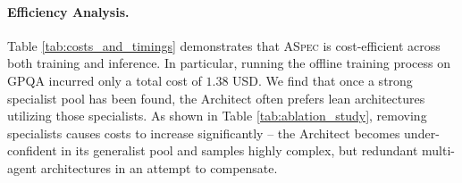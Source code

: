 \documentclass{article} %
\begin{document}
\begin{table}[H]
\caption{Efficiency comparison across methods on the GPQA benchmark.}
\label{tab:costs_and_timings}
\centering
\scriptsize
{}
\end{table}


\paragraph{Efficiency Analysis.} Table \ref{tab:costs_and_timings} demonstrates that \textsc{ASpec} is cost-efficient across both training and inference. In particular, running the offline training process on GPQA incurred only a total cost of \(1.38\) USD. We find that once a strong specialist pool has been found, the Architect often prefers lean architectures utilizing those specialists. As shown in Table \ref{tab:ablation_study}, removing specialists causes costs to increase significantly -- the Architect becomes under-confident in its generalist pool and samples highly complex, but redundant multi-agent architectures in an attempt to compensate.
\end{document}
